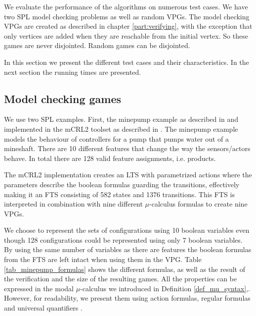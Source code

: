 We evaluate the performance of the algorithms on numerous test cases. We have two SPL model checking problems as well as random VPGs. The model checking VPGs are created as described in chapter \ref{part:verifying}, with the exception that only vertices are added when they are reachable from the initial vertex. So these games are never disjointed. Random games can be disjointed. 

In this section we present the different test cases and their characteristics. In the next section the running times are presented.

\subsection{Model checking games}
We use two SPL examples. First, the minepump example as described in \cite{Kramer1983CONICAI} and implemented in the mCRL2 toolset \cite{mCRL2Toolset} as described in \cite{FamBasedModelCheckingWithMCRL2}. The minepump example models the behaviour of controllers for a pump that pumps water out of a mineshaft. There are 10 different features that change the way the sensors/actors behave. In total there are 128 valid feature assignments, i.e. products. 

The mCRL2 implementation creates an LTS with parametrized actions where the parameters describe the boolean formulas guarding the transitions, effectively making it an FTS consisting of 582 states and 1376 transitions. This FTS is interpreted in combination with nine different $\mu$-calculus formulas to create nine VPGs.

We choose to represent the sets of configurations using 10 boolean variables even though 128 configurations could be represented using only 7 boolean variables. By using the same number of variables as there are features the boolean formulas from the FTS are left intact when using them in the VPG. Table \ref{tab_minepump_formulas} shows the different formulas, as well as the result of the verification and the size of the resulting games. All the properties can be expressed in the modal $\mu$-calculus we introduced in Definition \ref{def_mu_syntax},. However, for readability, we present them using action formulas, regular formulas and universal quantifiers  \cite{Groote}.

